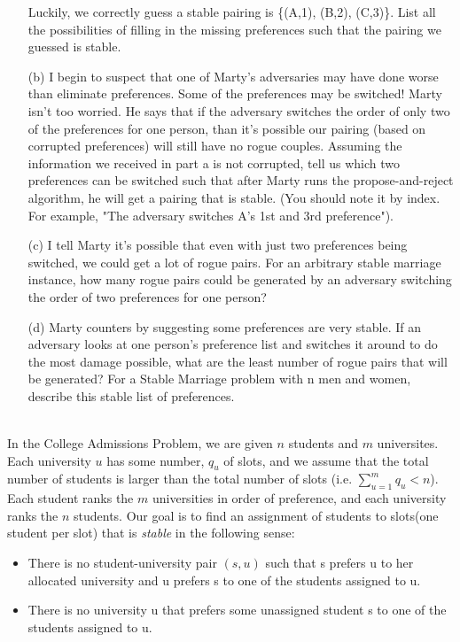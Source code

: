 \documentclass[11pt]{article}
\begin{document}
\begin{qunlist}
\begin{itemize}
        Luckily, we correctly guess a stable pairing is \{(A,1), (B,2), (C,3)\}. List all the possibilities of filling in the missing preferences such that the pairing we guessed is stable. 
        
\item[(b)] I begin to suspect that one of Marty's adversaries may have done worse than eliminate preferences. Some of the preferences may be switched! Marty isn't too worried. He says that if the adversary switches the order of only two of the preferences for one person, than it's possible our pairing (based on corrupted preferences) will still have no rogue couples. Assuming the information we received in part a is not corrupted, tell us which two preferences can be switched such that after Marty runs the propose-and-reject algorithm, he will get a pairing that is stable. (You should note it by index. For example, "The adversary switches A's 1st and 3rd preference").
        
\item[(c)] I tell Marty it's possible that even with just two preferences being switched, we could get a lot of rogue pairs. For an arbitrary stable marriage instance, how many rogue pairs could be generated by an adversary switching the order of two preferences for one person?
        
\item[(d)] Marty counters by suggesting some preferences are very stable. If an adversary looks at one person's preference list and switches it around to do the most damage possible, what are the least number of rogue pairs that will be generated? For a Stable Marriage problem with n men and women, describe this stable list of preferences.


\end{itemize}


\\
In the College Admissions Problem, we are given $n$ students and $m$ universites. Each university $u$ has some number, $q_u$ of slots, and we assume that the total number of students is larger than the total number of slots
(i.e. $\sum_{u=1}^m{q_u} < n$). Each student ranks the $m$ universities in order of preference, and each university ranks the $n$ students. Our goal is to find an assignment of students to slots(one student per slot) that is
\textit{stable} in the following sense:
\begin{itemize}
\item There is no student-university pair $(s,u)$ such that s prefers u to her allocated university and u prefers s to one of the students assigned to u.
\item There is no university u that prefers some unassigned student s to one of the students assigned to u.
\end{itemize}


\end{qunlist}
\end{document}
